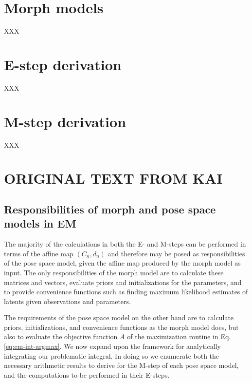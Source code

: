 \documentclass{article}         %
\begin{document}
\section{Morph models}

XXX

\section{E-step derivation}

XXX

\section{M-step derivation}

XXX

\section{ORIGINAL TEXT FROM KAI}

\subsection{Responsibilities of morph and pose space models in EM}

The majority of the calculations in both the E- and M-steps can be performed in terms of the affine map $(C_n, d_n)$ and therefore may be posed as responsibilities of the pose space model, given the affine map produced by the morph model as input. The only responsibilities of the morph model are to calculate these matrices and vectors, evaluate priors and initializations for the parameters, and to provide convenience functions such as finding maximum likelihood estimates of latents given observations and parameters.

The requirements of the pose space model on the other hand are to calculate priors, initializations, and convenience functions as the morph model does, but also to evaluate the objective function $A$ of the maximization routine in Eq. \ref{eq:em-int-argmax}. We now expand upon the framework for analytically integrating our problematic integral. In doing so we enumerate both the necessary arithmetic results to derive for the M-step of each pose space model, and the computations to be performed in their E-steps.
\end{document}
